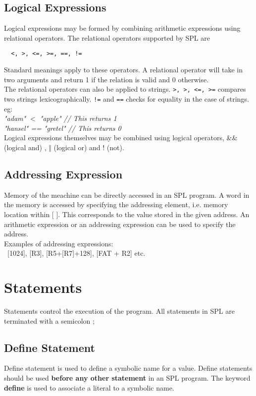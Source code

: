 \documentclass[11pt]{article}
\begin{document}
\subsection{Logical Expressions}

Logical expressions may be formed by combining arithmetic expressions using relational operators. 
The relational operators supported by SPL are \begin{verbatim}  <, >, <=, >=, ==, !=
\end{verbatim}
Standard  meanings apply to these operators. A relational operator will take in two arguments and return 1 if the relation is valid and 0 otherwise. \\
The relational operators can also be applied to strings. \texttt{>, >, <=, >=} compares two strings lexicographically.  \texttt{!=} and \texttt{==} checks for equality in the case of strings. eg:\\
     \textit{"adam" $<$ "apple" // This returns 1 }\\
     \textit{"hansel" == "gretel" // This returns 0 }\\
Logical expressions themselves may be combined using logical operators, \&\& (logical and) ,  $\Vert$ (logical or) and ! (not).



\subsection{Addressing Expression}
Memory of the meachine can be directly accessed in an SPL program. A word in the memory is accessed by specifying the addressing element, i.e. memory location within [ ]. This corresponds to the value stored in the given address. An arithmetic expression or an addressing expression can be used to specify the address. \\

Examples of addressing expressions: \\\   
 [1024], [R3], [R5+[R7]+128], [FAT + R2] etc.

\section{Statements}

Statements control the execution of the program. All statements in SPL are terminated with a semicolon ;



\subsection{Define Statement}
Define statement is used to define a symbolic name for a value. Define statements should be used \textbf{before any other statement} in an SPL program. The keyword \textbf{define} is used to associate a literal to a symbolic name. \\
\end{document}
